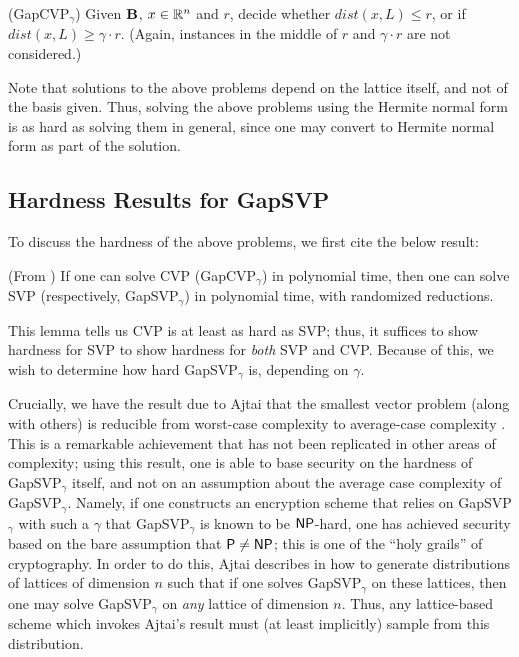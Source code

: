 \begin{definition}{(GapCVP$_\gamma$)}
Given $\textbf{B}$, $x \in \mathbb{R}^n$ and $r$, decide whether $\textit{dist}(x, L) \leq r$, or if $\textit{dist}(x, L) \geq \gamma \cdot r$. (Again, instances in the middle of $r$ and $\gamma \cdot r$ are not considered.)
\end{definition}

Note that solutions to the above problems depend on the lattice itself, and not of the basis given. Thus, solving the above problems using the Hermite normal form is as hard as solving them in general, since one may convert to Hermite normal form as part of the solution.

\subsection{Hardness Results for GapSVP} \label{sec: svpresults} \label{sec: adlatticeproblem}

To discuss the hardness of the above problems, we first cite the below result:

\begin{lemma} (From \cite{goldreich1999approximating})
    If one can solve CVP (GapCVP$_\gamma$) in polynomial time, then one can solve SVP (respectively, GapSVP$_\gamma$) in polynomial time, with randomized reductions.
\end{lemma}

This lemma tells us CVP is at least as hard as SVP; thus, it suffices to show hardness for SVP to show hardness for \emph{both} SVP and CVP. Because of this, we wish to determine how hard GapSVP$_\gamma$ is, depending on $\gamma$.

Crucially, we have the result due to Ajtai that  the smallest vector problem (along with others) is reducible from worst-case complexity to average-case complexity \cite{ajtai1996generating}. This is a remarkable achievement that has not been replicated in other areas of complexity; using this result, one is able to base security on the hardness of GapSVP$_\gamma$ itself, and not on an assumption about the average case complexity of GapSVP$_\gamma$. Namely, if one constructs an encryption scheme that relies on GapSVP$_\gamma$ with such a $\gamma$ that GapSVP$_\gamma$ is known to be ${\sf NP}$-hard, one has achieved security based on the bare assumption that ${\sf P} \neq {\sf NP}$; this is one of the ``holy grails'' of cryptography. In order to do this, Ajtai describes in \cite{ajtai1996generating} how to generate distributions of lattices of dimension $n$ such that if one solves GapSVP$_\gamma$ on these lattices, then one may solve GapSVP$_\gamma$ on \emph{any} lattice of dimension $n$. Thus, any lattice-based scheme which invokes Ajtai's result must (at least implicitly) sample from this distribution.



